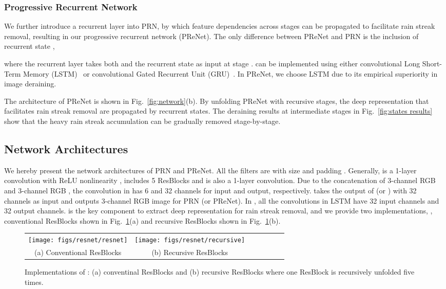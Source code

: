 \documentclass[10pt,twocolumn,letterpaper]{article}
\begin{document}
\vspace{-.1in}
\subsubsection{Progressive Recurrent Network}

We further introduce a recurrent layer into PRN, by which feature dependencies across stages can be propagated to facilitate rain streak removal, resulting in our progressive recurrent network (PReNet).
The only difference between PReNet and PRN is the inclusion of recurrent state ,

where the recurrent layer  takes both  and the recurrent state  as input at stage .
 can be implemented using either convolutional Long Short-Term Memory (LSTM)~\cite{hochreiter1997long,xingjian2015convolutional} or convolutional Gated Recurrent Unit (GRU)~\cite{cho2014learning}.
In PReNet, we choose LSTM due to its empirical superiority in image deraining.


The architecture of PReNet is shown in Fig.~\ref{fig:network}(b).
By unfolding PReNet with  recursive stages, the deep representation that facilitates rain streak removal are propagated by recurrent states.
The deraining results at intermediate stages in Fig.~\ref{fig:states results} show that the heavy rain streak accumulation can be gradually removed stage-by-stage.



\subsection{Network Architectures}
We hereby present the network architectures of PRN and PReNet.
All the filters are with size  and padding  .
Generally,  is a 1-layer convolution with ReLU nonlinearity \cite{nair2010rectified},  includes 5 {ResBlocks} and  is also a 1-layer convolution.
Due to the concatenation of 3-channel RGB  and 3-channel RGB , the convolution in  has 6 and 32 channels for input and output, respectively.
 takes the output of  (or ) with 32 channels as input and outputs 3-channel RGB image for PRN (or PReNet).
In ,  all the convolutions in LSTM have 32 input channels and 32 output channels.
 is the key component to extract deep representation for rain streak removal, and we provide two implementations, \ie, conventional ResBlocks shown in Fig.~\ref{fig:recursive resnet}(a) and recursive ResBlocks shown in Fig.~\ref{fig:recursive resnet}(b).


\begin{figure}[!ht]\footnotesize
	\centering
\begin{tabular}{ccccccc}
		\!\!\!\!\!\!
		\texttt{[image: figs/resnet/resnet]}   &
		
		\texttt{[image: figs/resnet/recursive]}\\
		(a) Conventional ResBlocks  & (b) Recursive ResBlocks\\
		
	\end{tabular}
	\caption{Implementations of : (a) conventinal ResBlocks and (b) recursive ResBlocks where one ResBlock is recursively unfolded five times.  }
	\label{fig:recursive resnet}
\end{figure}
\end{document}
